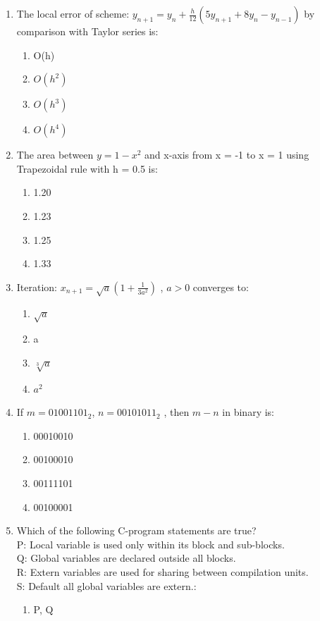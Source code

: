 \documentclass[journal,cmex10]{IEEEtran}
\theoremstyle{remark}
\numberwithin{equation}{enumi}
\numberwithin{figure}{enumi}
\begin{document}
\begin{enumerate}[label=\arabic*)]
    \item The local error of scheme: $y_{n+1} = y_n + \frac{h}{12} (5y_{n+1} + 8y_n - y_{n-1})$ by comparison with Taylor series is:
    \bigskip
    \hfill {}
    \begin{enumerate}[label=\alph*)]
        \item O(h)
        \item $O(h^2)$
        \item $O(h^3)$ 
        \item $O(h^4)$
    \end{enumerate}
    \bigskip

    \item The area between $y = 1 - x^2$ and x-axis from x = -1 to x = 1 using Trapezoidal rule with h = 0.5 is:
    \bigskip
    \hfill {}
    \begin{enumerate}[label=\alph*)]
        \item 1.20
        \item 1.23
        \item 1.25
        \item 1.33
    \end{enumerate}
    \bigskip

    \item Iteration: $x_{n+1} = \sqrt{a} \left(1 + \frac{1}{3a^2}\right)$ , $a > 0$ converges to:
    \bigskip
    \hfill {}
    \begin{enumerate}[label=\alph*)]
        \item $\sqrt{a}$
        \item a
        \item $\sqrt[3]{a}$
        \item $a^2$
    \end{enumerate}
    \newpage

    \item If $m = 01001101_2$, $n = 00101011_2$ , then $m - n$ in binary is:
    \bigskip
    \hfill {}
    \begin{enumerate}[label=\alph*)]
        \item 00010010
        \item 00100010
        \item 00111101
        \item 00100001
    \end{enumerate}
    \bigskip

    \item Which of the following C-program statements are true? \\
    P: Local variable is used only within its block and sub-blocks. \\
    Q: Global variables are declared outside all blocks. \\
    R: Extern variables are used for sharing between compilation units. \\
    S: Default all global variables are extern.:
    \bigskip
    \hfill {}
    \begin{enumerate}[label=\alph*)]
        \item P, Q
        

\end{enumerate}
\end{enumerate}
\end{document}

